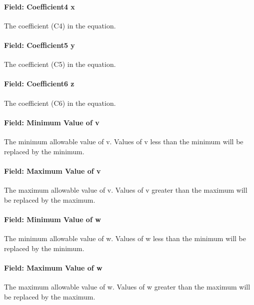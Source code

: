 \paragraph{Field: Coefficient4 x}\label{field-coefficient4-x}

The coefficient (C4) in the equation.

\paragraph{Field: Coefficient5 y}\label{field-coefficient5-y-2}

The coefficient (C5) in the equation.

\paragraph{Field: Coefficient6 z}\label{field-coefficient6-z}

The coefficient (C6) in the equation.

\paragraph{Field: Minimum Value of v}\label{field-minimum-value-of-v}

The minimum allowable value of v. Values of v less than the minimum will be replaced by the minimum.

\paragraph{Field: Maximum Value of v}\label{field-maximum-value-of-v}

The maximum allowable value of v. Values of v greater than the maximum will be replaced by the maximum.

\paragraph{Field: Minimum Value of w}\label{field-minimum-value-of-w-1}

The minimum allowable value of w. Values of w less than the minimum will be replaced by the minimum.

\paragraph{Field: Maximum Value of w}\label{field-maximum-value-of-w-1}

The maximum allowable value of w. Values of w greater than the maximum will be replaced by the maximum.

